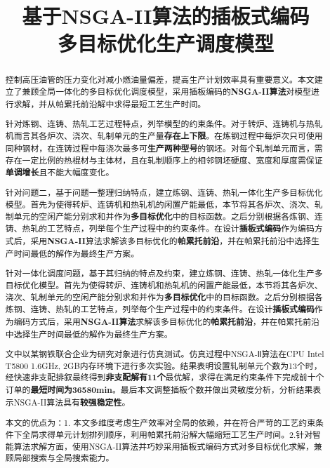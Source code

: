 \documentclass{whutmod}
\title{基于NSGA-II算法的插板式编码\\多目标优化生产调度模型}
\begin{document}
	\maketitle
	\thispagestyle{empty}
	\begin{abstract}
		
		控制高压油管的压力变化对减小燃油量偏差，提高生产计划效率具有重要意义。本文建立了兼顾全局一体化的多目标优化调度模型，采用插板编码的\textbf{NSGA-II算法}对模型进行求解，并从帕累托前沿解中求得最短工艺生产时间。

		\vspace{7pt}	%

		针对炼钢、连铸、热轧工艺过程特点，列举模型的约束条件。对于转炉、连铸机与热轧机而言其各炉次、浇次、轧制单元的生产量\textbf{存在上下限}。在炼钢过程中每炉次只可使用同种钢材，在连铸过程中每浇次最多可\textbf{生产两种型号}的钢坯。对每个轧制单元而言，需存在一定比例的热棍材与主体材，且在轧制顺序上的相邻钢坯硬度、宽度和厚度需保证\textbf{单调增长}且不能大幅度变化。

		\vspace{8pt}	%

		针对问题二，基于问题一整理归纳特点，建立炼钢、连铸、热轧一体化生产多目标优化模型。首先为使得转炉、连铸机和热轧机的闲置产能最低，本节将其各炉次、浇次、轧制单元的空闲产能分别求和并作为\textbf{多目标优化}中的目标函数。之后分别根据各炼钢、连铸、热轧的工艺特点，列举每个生产过程中的约束条件。在设计\textbf{插板式编码}作为编码方式后，采用\textbf{NSGA-II}算法求解该多目标优化的\textbf{帕累托前沿}，并在帕累托前沿中选择生产时间最低的解作为最终生产方案。

		针对一体化调度问题，基于其归纳的特点及约束，建立炼钢、连铸、热轧一体化生产多目标优化模型。首先为使得转炉、连铸机和热轧机的闲置产能最低，本节将其各炉次、浇次、轧制单元的空闲产能分别求和并作为\textbf{多目标优化}中的目标函数。之后分别根据各炼钢、连铸、热轧的工艺特点，列举每个生产过程中的约束条件。在设计\textbf{插板式编码}作为编码方式后，采用\textbf{NSGA-II算法}求解该多目标优化的\textbf{帕累托前沿}，并在帕累托前沿中选择生产时间最低的解作为最终生产方案。
		\vspace{8pt}	%
		
		文中以某钢铁联合企业为研究对象进行仿真测试。仿真过程中NSGA-Ⅱ算法在CPU Intel T5800 1.6GHz, 2GB内存环境下进行多次实验。结果表明设置轧制单元个数为13个时，经快速非支配排叙最终得到\textbf{非支配解有11个}最优解，求得在满足约束条件下完成前十个订单的\textbf{最短时间为36580min}。最后本文调整插板个数并做出灵敏度分析，分析结果表示NSGA-II算法具有\textbf{较强稳定性}。
		\vspace{8pt}	%

		本文的优点为：1. 本文多维度考虑生产效率对全局的依赖，并在符合严苛的工艺约束条件下全局求得单元计划排列顺序，利用帕累托前沿解大幅缩短工艺生产时间。2.针对智能算法求解方面，使用NSGA-II算法并巧妙采用插板式编码方式对多目标优化求解，兼顾局部搜索与全局搜索能力。
		
		
	\end{abstract}
\end{document}

